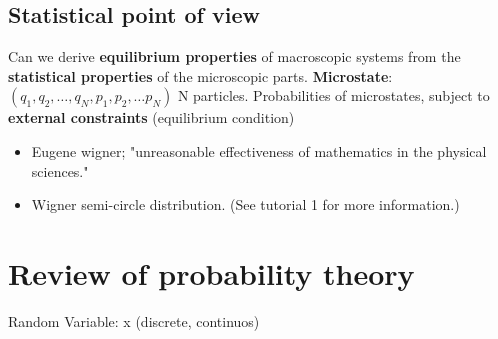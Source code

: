 \subsection*{Statistical point of view}
Can we derive \textbf{equilibrium properties} of macroscopic systems from the \textbf{statistical properties} of the microscopic parts. 
\textbf{Microstate}:\((q_1,q_2,\ldots,q_N,p_1,p_2,\ldots p_N)\) N particles. 
Probabilities of microstates, subject to \textbf{external constraints} (equilibrium condition)
\begin{itemize}
    \item Eugene wigner; "unreasonable effectiveness of mathematics in the physical sciences."
    \item Wigner semi-circle distribution. (See tutorial 1 for more information.)
\end{itemize}
\section{Review of probability theory}
Random Variable: x (discrete, continuos)